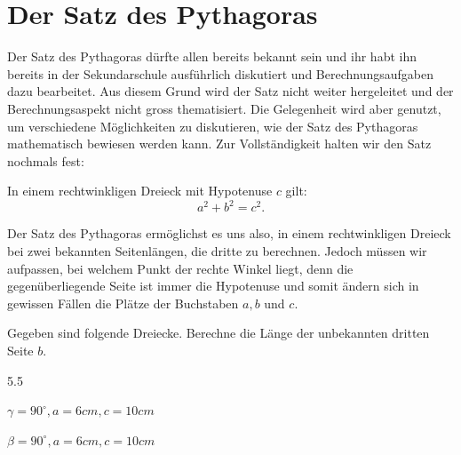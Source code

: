 \documentclass[11pt,oneside]{article}
\begin{document}
\section{Der Satz des Pythagoras}
	Der Satz des Pythagoras dürfte allen bereits bekannt sein und ihr habt ihn bereits in der Sekundarschule ausführlich diskutiert und Berechnungsaufgaben dazu bearbeitet. Aus diesem Grund wird der Satz nicht weiter hergeleitet und der Berechnungsaspekt nicht gross thematisiert. Die Gelegenheit wird aber genutzt, um verschiedene Möglichkeiten zu diskutieren, wie der Satz des Pythagoras mathematisch bewiesen werden kann. Zur Vollständigkeit halten wir den Satz nochmals fest:
	\begin{satz}
		\label{satz:pythagoras}
		In einem rechtwinkligen Dreieck mit Hypotenuse $c$ gilt: \[a^2+b^2=c^2.\]
	\end{satz}
	Der Satz des Pythagoras ermöglichst es uns also, in einem rechtwinkligen Dreieck bei zwei bekannten Seitenlängen, die dritte zu berechnen. Jedoch müssen wir aufpassen, bei welchem Punkt der rechte Winkel liegt, denn die gegenüberliegende Seite ist immer die Hypotenuse und somit ändern sich in gewissen Fällen die Plätze der Buchstaben $a,b$ und $c$.\newpage
	\begin{beispiel}
		Gegeben sind folgende Dreiecke. Berechne die Länge der unbekannten dritten Seite $b$.
		\begin{gridspace}{5.5}
			\vspace{-2pt}
			\begin{enumcols}[2]
				\item $\gamma=90^\circ, a=6cm, c=10cm$
				\item $\beta=90^\circ, a=6cm, c=10cm$
			\end{enumcols}
		\end{gridspace}
	\end{beispiel}
\end{document}
